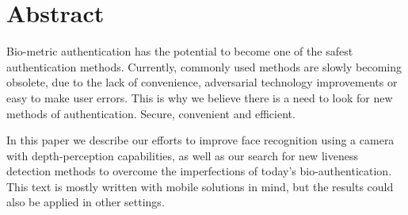 \section*{Abstract}
Bio-metric authentication has the potential to become
one of the safest authentication methods.
Currently, commonly used methods are slowly becoming obsolete,
due to the lack of convenience, adversarial technology
improvements or easy to make user errors.
This is why we believe there is a need to look for
new methods of authentication. Secure, convenient and efficient.\par
\bigskip


In this paper we describe our efforts to improve face recognition
using a camera with depth-perception capabilities, as well as
our search for new liveness detection methods to overcome
the imperfections of today's bio-authentication.\\
This text is mostly written with mobile solutions in mind,
but the results could also be applied in other settings.
